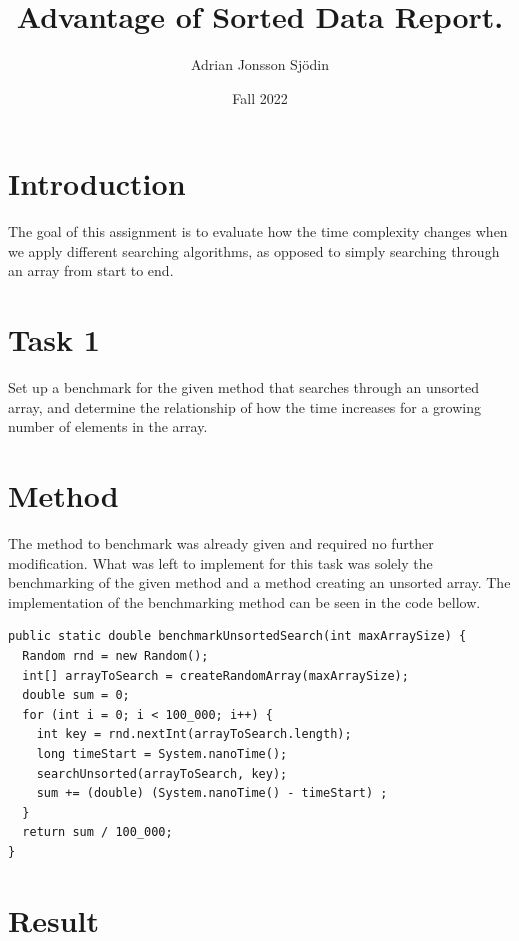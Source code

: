 \documentclass[a4paper,11pt]{article}
\begin{document}
\title{
  \textbf{Advantage of Sorted Data Report.}
}
\author{Adrian Jonsson Sjödin}
\date{Fall 2022}

\maketitle

\section*{Introduction}
The goal of this assignment is to evaluate how the time complexity changes when we apply different searching algorithms, as opposed to simply
searching through an array from start to end.
\section*{Task 1}

Set up a benchmark for the given method that searches through an unsorted array, and determine the relationship of how the time increases for a
growing number of elements in the array.

\section*{Method}

The method to benchmark was already given and required no further modification. What was left to implement for this task was solely the benchmarking
of the given method and a method creating an unsorted array. The implementation of the
benchmarking method can be seen in the code bellow.

\begin{verbatim}
public static double benchmarkUnsortedSearch(int maxArraySize) {
  Random rnd = new Random();
  int[] arrayToSearch = createRandomArray(maxArraySize);
  double sum = 0;
  for (int i = 0; i < 100_000; i++) {
    int key = rnd.nextInt(arrayToSearch.length);
    long timeStart = System.nanoTime();
    searchUnsorted(arrayToSearch, key);
    sum += (double) (System.nanoTime() - timeStart) ;
  }
  return sum / 100_000;
}
\end{verbatim}

\section*{Result}
\end{document}
